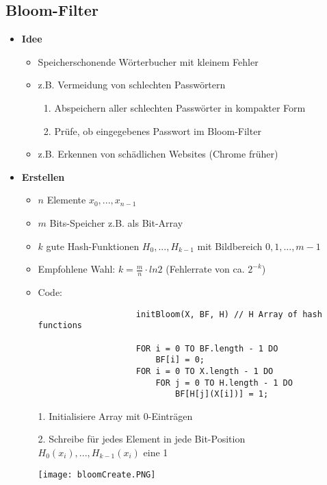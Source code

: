 \subsection{Bloom-Filter}
    \begin{itemize}
        \item \textbf{Idee}
            \begin{itemize}
                \item Speicherschonende Wörterbucher mit kleinem Fehler
                \item z.B. Vermeidung von schlechten Passwörtern 
                    \begin{enumerate}
                        \item Abspeichern aller schlechten Passwörter in kompakter Form
                        \item Prüfe, ob eingegebenes Passwort im Bloom-Filter
                    \end{enumerate}
                \item z.B. Erkennen von schädlichen Websites (Chrome früher)
            \end{itemize}

        \item \textbf{Erstellen}
            \begin{itemize}
                \item $n$ Elemente $x_0,...,x_{n-1}$
                \item $m$ Bits-Speicher z.B. als Bit-Array
                \item $k$ gute Hash-Funktionen $H_0,...,H_{k-1}$ mit Bildbereich $0,1,...,m-1$
                \item Empfohlene Wahl: $k = \frac{m}{n} \cdot ln2$ (Fehlerrate von ca. $2^{-k}$)
                \item Code:
                \item[]
                    \begin{verbatim}
                    initBloom(X, BF, H) // H Array of hash functions

                    FOR i = 0 TO BF.length - 1 DO 
                        BF[i] = 0;
                    FOR i = 0 TO X.length - 1 DO
                        FOR j = 0 TO H.length - 1 DO
                            BF[H[j](X[i])] = 1;
                    \end{verbatim}
                \item[]
                \item[1.] Initialisiere Array mit 0-Einträgen
                \item[2.] Schreibe für jedes Element in jede Bit-Position $H_0(x_i),...,H_{k-1}(x_i)$ eine 1 
                \item[] \texttt{[image: bloomCreate.PNG]} 
            \end{itemize}


\end{itemize}
